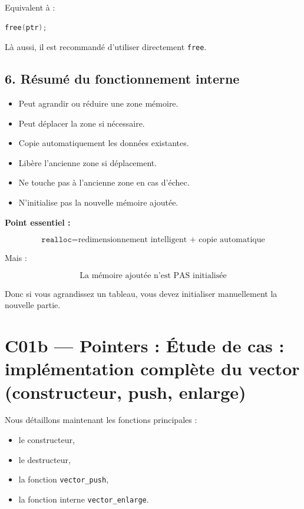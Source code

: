 Equivalent à :

\begin{lstlisting}[language=C]
free(ptr);
\end{lstlisting}

Là aussi, il est recommandé d’utiliser directement \texttt{free}.

\subsection*{6. Résumé du fonctionnement interne}

\begin{itemize}
    \item Peut agrandir ou réduire une zone mémoire.
    \item Peut déplacer la zone si nécessaire.
    \item Copie automatiquement les données existantes.
    \item Libère l’ancienne zone si déplacement.
    \item Ne touche pas à l’ancienne zone en cas d’échec.
    \item N’initialise pas la nouvelle mémoire ajoutée.
\end{itemize}

\bigskip
\textbf{Point essentiel :}

\[
\boxed{\texttt{realloc} = \text{redimensionnement intelligent + copie automatique}}
\]

Mais :

\[
\boxed{\text{La mémoire ajoutée n’est PAS initialisée}}
\]

Donc si vous agrandissez un tableau,
vous devez initialiser manuellement la nouvelle partie.

\section{C01b — Pointers : Étude de cas : implémentation complète du vector (constructeur, push, enlarge)}

Nous détaillons maintenant les fonctions principales :
\begin{itemize}
    \item le constructeur,
    \item le destructeur,
    \item la fonction \texttt{vector\_push},
    \item la fonction interne \texttt{vector\_enlarge}.
\end{itemize}

